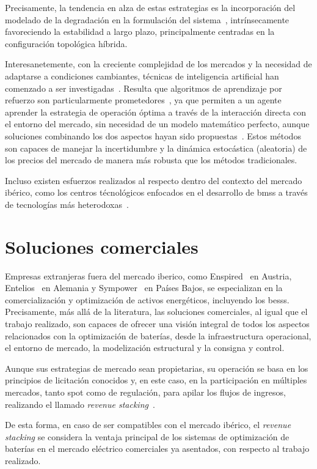 Precisamente, la tendencia en alza de estas estrategias es la incorporación del modelado de la degradación en la formulación del sistema~\cite{liu2022milp, minh2024mixed, spiller2020aging}, intrínsecamente favoreciendo la estabilidad a largo plazo, principalmente centradas en la configuración topológica híbrida.

Interesanetemente, con la creciente complejidad de los mercados y la necesidad de adaptarse a condiciones cambiantes, técnicas de inteligencia artificial han comenzado a ser investigadas~\cite{haratian2024machine, krishna2024advanced}. Resulta que algoritmos de aprendizaje por refuerzo son particularmente prometedores~\cite{dong2021strategic}, ya que permiten a un agente aprender la estrategia de operación óptima a través de la interacción directa con el entorno del mercado, sin necesidad de un modelo matemático perfecto, aunque soluciones combinando los dos aspectos hayan sido propuestas~\cite{georgiadis2025hybrid}. Estos métodos son capaces de manejar la incertidumbre y la dinámica estocástica (aleatoria) de los precios del mercado de manera más robusta que los métodos tradicionales.

Incluso existen esfuerzos realizados al respecto dentro del contexto del mercado ibérico, como los centros técnológicos enfocados en el desarrollo de \glspl{bms} a través de tecnologías más heterodoxas~\cite{ikerlan2025bateria}.

\section{Soluciones comerciales}
\label{makereference2.3}

Empresas extranjeras fuera del mercado iberico, como Enspired~\cite{enspired2025battery} en Austria, Entelios~\cite{entelios2025cross} en Alemania y Sympower~\cite{sympower2025battery} en Países Bajos, se especializan en la comercialización y optimización de activos energéticos, incluyendo los \glspl{bess}. Precisamente, más allá de la literatura, las soluciones comerciales, al igual que el trabajo realizado, son capaces de ofrecer una visión integral de todos los aspectos relacionados con la optimización de baterías, desde la infraestructura operacional, el entorno de mercado, la modelización estructural y la consigna y control.

Aunque sus estrategias de mercado sean propietarias, su operación se basa en los principios de licitación conocidos y, en este caso, en la participación en múltiples mercados, tanto spot como de regulación, para apilar los flujos de ingresos, realizando el llamado \textit{revenue stacking}~\cite{rancilio2022revenue}.

De esta forma, en caso de ser compatibles con el mercado ibérico, el \textit{revenue stacking} se considera la ventaja principal de los sistemas de optimización de baterías en el mercado eléctrico comerciales ya asentados, con respecto al trabajo realizado.
